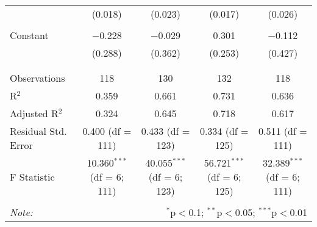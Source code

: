 \begin{table}[!htbp]
\begin{tabular}{@{\extracolsep{5pt}}lcccc}
  & (0.018) & (0.023) & (0.017) & (0.026) \\ 
  & & & & \\ 
 Constant & $-$0.228 & $-$0.029 & 0.301 & $-$0.112 \\ 
  & (0.288) & (0.362) & (0.253) & (0.427) \\ 
  & & & & \\ 
\hline \\[-1.8ex] 
Observations & 118 & 130 & 132 & 118 \\ 
R$^{2}$ & 0.359 & 0.661 & 0.731 & 0.636 \\ 
Adjusted R$^{2}$ & 0.324 & 0.645 & 0.718 & 0.617 \\ 
Residual Std. Error & 0.400 (df = 111) & 0.433 (df = 123) & 0.334 (df = 125) & 0.511 (df = 111) \\ 
F Statistic & 10.360$^{***}$ (df = 6; 111) & 40.055$^{***}$ (df = 6; 123) & 56.721$^{***}$ (df = 6; 125) & 32.389$^{***}$ (df = 6; 111) \\ 
\hline 
\hline \\[-1.8ex] 
\textit{Note:}  & \multicolumn{4}{r}{$^{*}$p$<$0.1; $^{**}$p$<$0.05; $^{***}$p$<$0.01} \\ 
\end{tabular} 
\end{table} 
